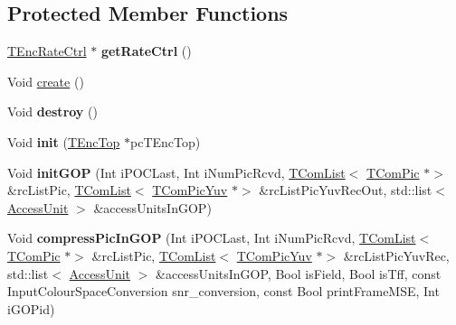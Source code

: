 \subsection*{Protected Member Functions}
\begin{DoxyCompactItemize}
\item 
\mbox{\label{class_t_enc_g_o_p_a25c3bd98a412cb879c8130bd178af331}} 
\hyperlink{class_t_enc_rate_ctrl}{T\+Enc\+Rate\+Ctrl} $\ast$ {\bfseries get\+Rate\+Ctrl} ()
\end{DoxyCompactItemize}
\begin{DoxyCompactItemize}
\item 
Void \hyperlink{class_t_enc_g_o_p_a21354e2a53f811c0b5157add7b8b744f}{create} ()
\item 
\mbox{\label{class_t_enc_g_o_p_a8091c0877d571ad70f91b27cee029061}} 
Void {\bfseries destroy} ()
\item 
\mbox{\label{class_t_enc_g_o_p_ab383900af4b706d0592955187ddcc504}} 
Void {\bfseries init} (\hyperlink{class_t_enc_top}{T\+Enc\+Top} $\ast$pc\+T\+Enc\+Top)
\item 
\mbox{\label{class_t_enc_g_o_p_abb97caaa5271c0bb5b7ebdb2022a5f87}} 
Void {\bfseries init\+G\+OP} (Int i\+P\+O\+C\+Last, Int i\+Num\+Pic\+Rcvd, \hyperlink{class_t_com_list}{T\+Com\+List}$<$ \hyperlink{class_t_com_pic}{T\+Com\+Pic} $\ast$$>$ \&rc\+List\+Pic, \hyperlink{class_t_com_list}{T\+Com\+List}$<$ \hyperlink{class_t_com_pic_yuv}{T\+Com\+Pic\+Yuv} $\ast$$>$ \&rc\+List\+Pic\+Yuv\+Rec\+Out, std\+::list$<$ \hyperlink{class_access_unit}{Access\+Unit} $>$ \&access\+Units\+In\+G\+OP)
\item 
\mbox{\label{class_t_enc_g_o_p_a797ea8071dc45f4f8636eead3d840ebe}} 
Void {\bfseries compress\+Pic\+In\+G\+OP} (Int i\+P\+O\+C\+Last, Int i\+Num\+Pic\+Rcvd, \hyperlink{class_t_com_list}{T\+Com\+List}$<$ \hyperlink{class_t_com_pic}{T\+Com\+Pic} $\ast$$>$ \&rc\+List\+Pic, \hyperlink{class_t_com_list}{T\+Com\+List}$<$ \hyperlink{class_t_com_pic_yuv}{T\+Com\+Pic\+Yuv} $\ast$$>$ \&rc\+List\+Pic\+Yuv\+Rec, std\+::list$<$ \hyperlink{class_access_unit}{Access\+Unit} $>$ \&access\+Units\+In\+G\+OP, Bool is\+Field, Bool is\+Tff, const Input\+Colour\+Space\+Conversion snr\+\_\+conversion, const Bool print\+Frame\+M\+SE, Int i\+G\+O\+Pid)

\end{DoxyCompactItemize}

